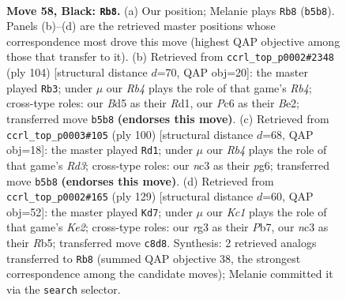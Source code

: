 \documentclass[11pt]{article}
\begin{document}
\clearpage

\begin{figure}[p]\centering
\begin{subfigure}{0.46\textwidth}\centering
\resizebox{\linewidth}{!}{%
\newchessgame
\chessboard[
  setfen={2k5/p1p3r1/P1p3p1/1rPb1p1p/RP3P1P/2N3R1/5K2/8 b - - 39 58},
  showmover=false,
  pgfstyle=straightmove, color=movearrow, markmove={b5-b8}
]}
\caption{}
\end{subfigure}\hfill
\begin{subfigure}{0.46\textwidth}\centering
\resizebox{\linewidth}{!}{%
\newchessgame
\chessboard[
  setfen={r7/rp2k3/4p1p1/b1Pp1p2/PR1P3p/K3P2P/4B1P1/3R4 w - - 28 53},
  showmover=false,
  pgfstyle=straightmove, color=movearrow, markmove={b4-b3}
]}
\caption{}
\end{subfigure}
\\[4pt]
\begin{subfigure}{0.46\textwidth}\centering
\resizebox{\linewidth}{!}{%
\newchessgame
\chessboard[
  setfen={1r6/4p1k1/4p1p1/p1rpP2p/5P1P/RPPR2P1/1K6/8 w - - 29 51},
  showmover=false,
  pgfstyle=straightmove, color=movearrow, markmove={d3-d1}
]}
\caption{}
\end{subfigure}\hfill
\begin{subfigure}{0.46\textwidth}\centering
\resizebox{\linewidth}{!}{%
\newchessgame
\chessboard[
  setfen={8/1p2kp2/2p3p1/1rP1P2p/pN2P2P/PbR1K1P1/1P6/8 b - - 50 65},
  showmover=false,
  pgfstyle=straightmove, color=movearrow, markmove={e7-d7}
]}
\caption{}
\end{subfigure}
\caption{\textbf{Move 58, Black: \texttt{Rb8}.} (a) Our position; Melanie plays \texttt{Rb8} (\texttt{b5b8}). Panels (b)--(d) are the retrieved master positions whose correspondence most drove this move (highest QAP objective among those that transfer to it). (b) Retrieved from \texttt{ccrl\_top\_p0002\#2348} (ply 104) [structural distance $d$=70, QAP obj=20]: the master played \texttt{Rb3}; under $\mu$ our \emph{Rb4} plays the role of that game's \emph{Rb4}; cross-type roles: our \emph{B}d5 as their \emph{R}d1, our \emph{P}c6 as their \emph{B}e2; transferred move \texttt{b5b8} \textbf{(endorses this move)}. (c) Retrieved from \texttt{ccrl\_top\_p0003\#105} (ply 100) [structural distance $d$=68, QAP obj=18]: the master played \texttt{Rd1}; under $\mu$ our \emph{Rb4} plays the role of that game's \emph{Rd3}; cross-type roles: our \emph{n}c3 as their \emph{p}g6; transferred move \texttt{b5b8} \textbf{(endorses this move)}. (d) Retrieved from \texttt{ccrl\_top\_p0002\#165} (ply 129) [structural distance $d$=60, QAP obj=52]: the master played \texttt{Kd7}; under $\mu$ our \emph{Kc1} plays the role of that game's \emph{Ke2}; cross-type roles: our \emph{r}g3 as their \emph{P}b7, our \emph{n}c3 as their \emph{R}b5; transferred move \texttt{c8d8}. Synthesis: 2 retrieved analogs transferred to \texttt{Rb8} (summed QAP objective 38, the strongest correspondence among the candidate moves); Melanie committed it via the \texttt{search} selector.}
\label{fig:thought-m115}
\end{figure}
\end{document}
